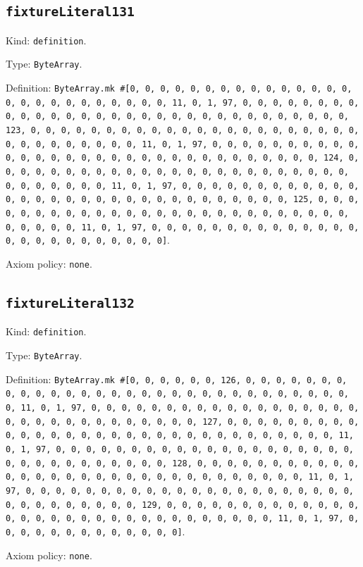 \documentclass[11pt]{article}
\begin{document}
\subsection*{\texttt{fixtureLiteral131}}
\noindent Kind: \texttt{definition}.\par
\noindent Type: \texttt{ByteArray}.\par
\noindent Definition: \texttt{ByteArray.mk \#[0, 0, 0, 0, 0, 0, 0, 0, 0, 0, 0, 0, 0, 0, 0, 0, 0, 0, 0, 0, 0, 0, 0, 0, 0, 0, 11, 0, 1, 97, 0, 0, 0, 0, 0, 0, 0, 0, 0, 0, 0, 0, 0, 0, 0, 0, 0, 0, 0, 0, 0, 0, 0, 0, 0, 0, 0, 0, 0, 0, 0, 123, 0, 0, 0, 0, 0, 0, 0, 0, 0, 0, 0, 0, 0, 0, 0, 0, 0, 0, 0, 0, 0, 0, 0, 0, 0, 0, 0, 0, 0, 0, 0, 11, 0, 1, 97, 0, 0, 0, 0, 0, 0, 0, 0, 0, 0, 0, 0, 0, 0, 0, 0, 0, 0, 0, 0, 0, 0, 0, 0, 0, 0, 0, 0, 0, 0, 0, 124, 0, 0, 0, 0, 0, 0, 0, 0, 0, 0, 0, 0, 0, 0, 0, 0, 0, 0, 0, 0, 0, 0, 0, 0, 0, 0, 0, 0, 0, 0, 0, 11, 0, 1, 97, 0, 0, 0, 0, 0, 0, 0, 0, 0, 0, 0, 0, 0, 0, 0, 0, 0, 0, 0, 0, 0, 0, 0, 0, 0, 0, 0, 0, 0, 0, 0, 125, 0, 0, 0, 0, 0, 0, 0, 0, 0, 0, 0, 0, 0, 0, 0, 0, 0, 0, 0, 0, 0, 0, 0, 0, 0, 0, 0, 0, 0, 0, 0, 11, 0, 1, 97, 0, 0, 0, 0, 0, 0, 0, 0, 0, 0, 0, 0, 0, 0, 0, 0, 0, 0, 0, 0, 0, 0, 0, 0, 0]}.\par
\noindent Axiom policy: \texttt{none}.\par
\subsection*{\texttt{fixtureLiteral132}}
\noindent Kind: \texttt{definition}.\par
\noindent Type: \texttt{ByteArray}.\par
\noindent Definition: \texttt{ByteArray.mk \#[0, 0, 0, 0, 0, 0, 126, 0, 0, 0, 0, 0, 0, 0, 0, 0, 0, 0, 0, 0, 0, 0, 0, 0, 0, 0, 0, 0, 0, 0, 0, 0, 0, 0, 0, 0, 0, 0, 11, 0, 1, 97, 0, 0, 0, 0, 0, 0, 0, 0, 0, 0, 0, 0, 0, 0, 0, 0, 0, 0, 0, 0, 0, 0, 0, 0, 0, 0, 0, 0, 0, 0, 0, 127, 0, 0, 0, 0, 0, 0, 0, 0, 0, 0, 0, 0, 0, 0, 0, 0, 0, 0, 0, 0, 0, 0, 0, 0, 0, 0, 0, 0, 0, 0, 0, 11, 0, 1, 97, 0, 0, 0, 0, 0, 0, 0, 0, 0, 0, 0, 0, 0, 0, 0, 0, 0, 0, 0, 0, 0, 0, 0, 0, 0, 0, 0, 0, 0, 0, 0, 128, 0, 0, 0, 0, 0, 0, 0, 0, 0, 0, 0, 0, 0, 0, 0, 0, 0, 0, 0, 0, 0, 0, 0, 0, 0, 0, 0, 0, 0, 0, 0, 11, 0, 1, 97, 0, 0, 0, 0, 0, 0, 0, 0, 0, 0, 0, 0, 0, 0, 0, 0, 0, 0, 0, 0, 0, 0, 0, 0, 0, 0, 0, 0, 0, 0, 0, 129, 0, 0, 0, 0, 0, 0, 0, 0, 0, 0, 0, 0, 0, 0, 0, 0, 0, 0, 0, 0, 0, 0, 0, 0, 0, 0, 0, 0, 0, 0, 0, 11, 0, 1, 97, 0, 0, 0, 0, 0, 0, 0, 0, 0, 0, 0, 0, 0]}.\par
\noindent Axiom policy: \texttt{none}.\par
\end{document}
